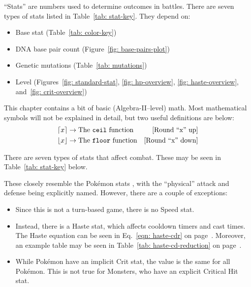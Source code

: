 
\def\tableWidth{0.5\textwidth}

\begin{tldr}
``Stats'' are numbers used to determine outcomes in battles. There are seven types of stats listed in Table~\ref{tab: stat-key}. They depend on:

\begin{itemize}
	\item{Base stat (Table~\ref{tab: color-key})}
	\item{DNA base pair count (Figure~\ref{fig: base-pairs-plot})}
	\item{Genetic mutations (Table~\ref{tab: mutations})}
	\item{Level (Figures~\ref{fig: standard-stat}, \ref{fig: hp-overview}, \ref{fig: haste-overview}, and~\ref{fig: crit-overview})}
\end{itemize}

\end{tldr}



This chapter contains a bit of basic (Algebra-II--level) math. Most mathematical symbols will not be explained in detail, but two useful definitions are below:
\begin{align*}
	\lceil x\rceil &\rightarrow \text{The \texttt{ceil} function} & \text{[Round ``x'' up]}\\
	\lfloor x\rfloor &\rightarrow \text{The \texttt{floor} function} & \text{[Round ``x'' down]}\\
\end{align*}

There are seven types of stats that affect combat. These may be seen in Table~\ref{tab: stat-key} below. 

		
\noindent These closely resemble the Pok\'{e}mon stats \cite{pkmn-stats}, with the ``physical'' attack and defense being explicitly named. However, there are a couple of exceptions:

\begin{itemize}
	\item{Since this is not a turn-based game, there is no Speed stat.}
	\item{Instead, there is a Haste stat, which affects cooldown timers and cast times. The Haste equation can be seen in Eq.~\eqref{eqn: haste-cdr} on page~\pageref{eqn: haste-cdr}. Moreover, an example table may be seen in Table~\ref{tab: haste-cd-reduction} on page~\pageref{tab: haste-cd-reduction}.}
	\item{While Pok\'{e}mon have an implicit Crit stat, the value is the same for all Pok\'{e}mon. This is not true for Monsters, who have an explicit Critical Hit stat.}
\end{itemize}

